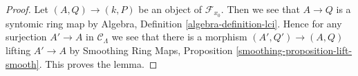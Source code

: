 \begin{proof}
Let $(A, Q) \to (k, P)$ be an object of $\mathcal{F}_{x_0}$.
Then we see that $A \to Q$ is a syntomic ring map by
Algebra, Definition \ref{algebra-definition-lci}.
Hence for any surjection $A' \to A$ in $\mathcal{C}_\Lambda$
we see that there is a morphism $(A', Q') \to (A, Q)$
lifting $A' \to A$ by
Smoothing Ring Maps, Proposition \ref{smoothing-proposition-lift-smooth}.
This proves the lemma.
\end{proof}













